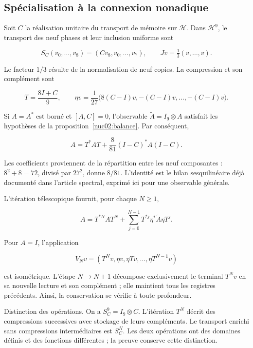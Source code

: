 \subsection{Spécialisation à la connexion nonadique}

Soit \(C\) la réalisation unitaire du transport de mémoire sur \(\mathcal H\). Dans \(\mathcal H^9\), le transport des neuf phases et leur inclusion uniforme sont

\[
S_C(v_0,\ldots,v_8)=(Cv_8,v_0,\ldots,v_7),
\qquad Jv=\tfrac13(v,\ldots,v).
\]

Le facteur \(1/3\) résulte de la normalisation de neuf copies. La compression et son complément sont

\[
T=\frac{8I+C}{9},\qquad
\eta v=\frac1{27}\bigl(8(C-I)v,-(C-I)v,\ldots,-(C-I)v\bigr).
\]

Si \(A=A^*\) est borné et \([A,C]=0\), l’observable \(\widetilde A=I_9\otimes A\) satisfait les hypothèses de la proposition~\ref{nuc02:balance}. Par conséquent,

\begin{equation}
\boxed{A=T^*AT+\frac8{81}(I-C)^*A(I-C).}\label{nuc02:eq:2}
\end{equation}

Les coefficients proviennent de la répartition entre les neuf composantes : \(8^2+8=72\), divisé par \(27^2\), donne \(8/81\). L’identité est le bilan sesquilinéaire déjà documenté dans l’article spectral, exprimé ici pour une observable générale.


L’itération télescopique fournit, pour chaque \(N\geq1\),

\begin{equation}
A=T^{*N}AT^N+
\sum_{j=0}^{N-1}T^{*j}\eta^*\widetilde A\eta T^j.\label{nuc02:eq:3}
\end{equation}

Pour \(A=I\), l’application

\[
V_Nv=(T^Nv,\eta v,\eta Tv,\ldots,\eta T^{N-1}v)
\]

est isométrique. L’étape \(N\to N+1\) décompose exclusivement le terminal \(T^Nv\) en sa nouvelle lecture et son complément ; elle maintient tous les registres précédents. Ainsi, la conservation se vérifie à toute profondeur.

Distinction des opérations. On a \(S_C^9=I_9\otimes C\). L’itération \(T^N\) décrit des compressions successives avec stockage de leurs compléments. Le transport enrichi sans compressions intermédiaires est \(S_C^N\). Les deux opérations ont des domaines définis et des fonctions différentes ; la preuve conserve cette distinction.

